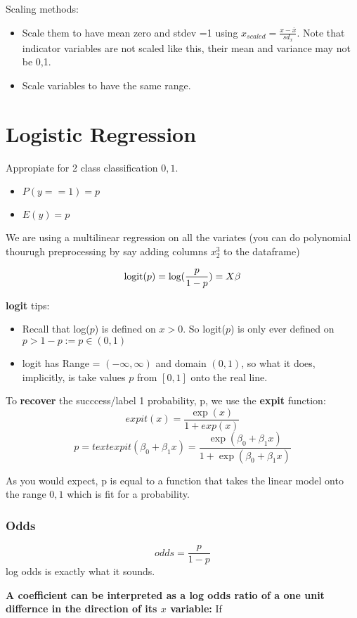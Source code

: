 \documentclass{article}
\begin{document}
Scaling methods:
\begin{itemize}
\item Scale them to have mean zero and stdev =1 using $x_{scaled} = \frac{x-\bar x}{sd_x}$. Note that indicator variables are not scaled like this, their mean and variance may not be 0,1.
\item Scale variables to have the same range.
\end{itemize}

\section{Logistic Regression}
Appropiate for 2 class classification $0,1$.
\begin{itemize}
\item $P(y==1) =p$
\item $E(y) = p$
\end{itemize}

We are using a multilinear regression on all the variates (you can do polynomial thourugh preprocessing by say adding columns $x_2^3$ to the dataframe)

\[
\text{logit}(p) = \text{log} (\frac{p}{1-p}) = X \bold\beta 
\]

\textbf{logit} tips:
\begin{itemize}
\item Recall that log($p$) is defined on $x>0$. So logit($p$) is only ever defined on $p>1-p := p \in (0,1)$
\item logit has Range = $(-\infty, \infty)$ and domain $(0,1)$, so what it does, implicitly, is take values $p$ from $[0,1]$ onto the real line.
\end{itemize}

To \textbf{recover} the succcess/label 1 probability, p, we use the \textbf{expit} function:
\[ expit(x) = \frac{\exp(x)}{1+exp(x)}\]
\[ p = text{expit}(\beta_0 + \beta_1x) = \frac{\exp(\beta_0 + \beta_1x)}{1+\exp(\beta_0 + \beta_1x)}\]

As you would expect, p is equal to a function that takes the linear model onto the range $0,1$ which is fit for a probability. 

\subsubsection{Odds}
\[odds = \frac{p}{1-p}\]
log odds is exactly what it sounds. 

\textbf{A coefficient can be interpreted as a log odds ratio of a one unit differnce in the direction of its $x$ variable:}
If
\end{document}
